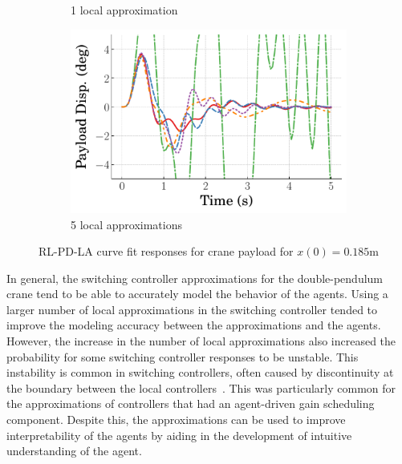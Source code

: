\begin{figure}
\begin{subfigure}[b]{0.32\textwidth}
        \caption{1 local approximation}
        \label{subfig_chap5:dpcrane_RL_PD_LA_payload_0.185_init_curve_fit_1_bins_unclipped}
    \end{subfigure}
    \hfill
    \begin{subfigure}[b]{0.32\textwidth}
        \centering
        \includegraphics[width=\textwidth]{figures/figures_Interpretability/Mean_ISE_dpcrane_cubic_5_bins/curve_fit_time_responses/RL_PD_LA/curve_fit_0p18_Payload_Disp.pdf} 
        \caption{5 local approximations}
        \label{subfig_chap5:dpcrane_RL_PD_LA_payload_0.185_init_curve_fit_5_bins_unclipped}
    \end{subfigure}
    \hfill
    \caption{RL-PD-LA curve fit responses for crane payload for $x(0)=0.185\si{\meter}$}
    \label{fig_chap5:dpcrane_RL_PD_LA_payload_0.185_init_unclipped}
\end{figure}
%

In general, the switching controller approximations for the double-pendulum crane tend to be able to accurately model the behavior of the agents. Using a larger number of local approximations in the switching controller tended to improve the modeling accuracy between the approximations and the agents.
However, the increase in the number of local approximations also increased the probability for some switching controller responses to be unstable.
This instability is common in switching controllers, often caused by discontinuity at the boundary between the local controllers~\cite{Liberzon:1999a,Liberzon:2003a}. This was particularly common for the approximations of controllers that had an agent-driven gain scheduling component. Despite this, the approximations can be used to improve interpretability of the agents by aiding in the development of intuitive understanding of the agent.

